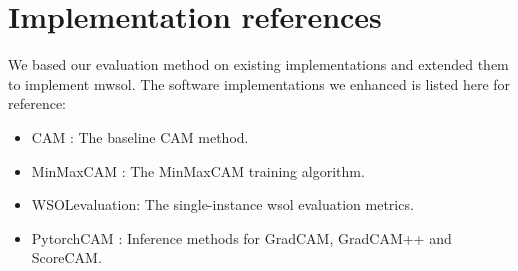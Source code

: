 \section{Implementation references}
We based our evaluation method on existing implementations and extended them to implement \acrlong{mwsol}. The software implementations we enhanced is listed here for reference:
\begin{itemize}
    \item CAM \cite{code:CAM}: The baseline CAM method.
    \item MinMaxCAM \cite{code:MinMaxCAM}: The MinMaxCAM training algorithm.
    \item WSOLevaluation\cite{code:WSOLevaluation}: The single-instance \acrshort{wsol} evaluation metrics.
    \item PytorchCAM \cite{code:PytorchCAM}: Inference methods for GradCAM, GradCAM++ and ScoreCAM.
\end{itemize}